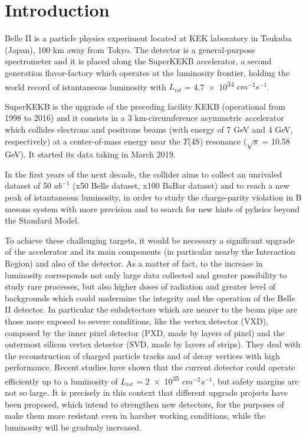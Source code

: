 

\chapter*{Introduction}

Belle II is a particle physics experiment located at KEK laboratory in Tsukuba (Japan), 100 km away from Tokyo. The detector is a general-purpose spectrometer and it is placed along the SuperKEKB accelerator, a second generation flavor-factory which operates at the luminosity frontier, holding the world record of istantaneous luminosity with $L_{ist}$ = \num{4.7e34} $cm^{-2} s^{-1}$. 

SuperKEKB is the upgrade of the preceding facility KEKB (operational from 1998 to 2016) and it consists in a 3 km-circumference asymmetric accelerator which collides electrons and positrons beams (with energy of 7 GeV and 4 GeV, respectively) at a center-of-mass energy near the $\Upsilon$(4S) resonance ($\sqrt{s}$ = 10.58 GeV). It started its data taking in March 2019.

In the first years of the next decade, the collider aims to collect  an unrivaled dataset of 50 $ab^{-1}$ (x50 Belle dataset, x100 BaBar dataset) and to reach a new peak of istantaneous luminosity, in order to study the charge-parity violation in B mesons system with more precision and to search for new hints of pyhsics beyond the Standard Model.

To achieve these challenging targets, it would be necessary a significant upgrade of the accelerator and its main components (in particular nearby the Interaction Region) and also of the detector. As a matter of fact, to the increase in luminosity corresponds not only large data collected and greater possibility to study rare processes, but also higher doses of radiation and greater level of backgrounds which could undermine the integrity and the operation of the Belle II detector.
In particular the subdetectors which are nearer to the beam pipe are those more exposed to severe conditions, like the vertex detector (VXD), composed by the inner pixel detector (PXD, made by layers of pixel) and the outermost silicon vertex detector (SVD, made by layers of strips). They deal with the reconstruction of charged particle tracks and of decay vertices with high performance. Recent studies have shown that the current detector could operate efficiently up to a luminosity of $L_{ist}$ = \num{2e35} $cm^{-2} s^{-1}$, but safety margins are not so large. 
It is precisely in this context that different upgrade projects have been proposed, which intend to strengthen new detectors, for the purposes of make them more resistant even in harsher working conditions, while the luminosity will be gradualy increased. 

